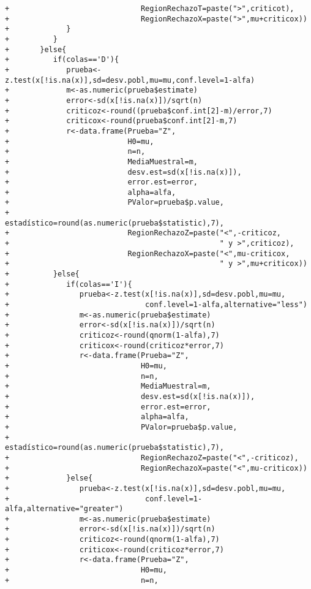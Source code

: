 \begin{solucion}
\begin{verbatim}
+                              RegionRechazoT=paste(">",criticot),
+                              RegionRechazoX=paste(">",mu+criticox))
+             }
+          }
+       }else{
+          if(colas=='D'){
+             prueba<-z.test(x[!is.na(x)],sd=desv.pobl,mu=mu,conf.level=1-alfa)
+             m<-as.numeric(prueba$estimate)
+             error<-sd(x[!is.na(x)])/sqrt(n)
+             criticoz<-round((prueba$conf.int[2]-m)/error,7)
+             criticox<-round(prueba$conf.int[2]-m,7)
+             r<-data.frame(Prueba="Z",
+                           H0=mu,
+                           n=n,
+                           MediaMuestral=m,
+                           desv.est=sd(x[!is.na(x)]),
+                           error.est=error,
+                           alpha=alfa,
+                           PValor=prueba$p.value,
+                           estadístico=round(as.numeric(prueba$statistic),7),
+                           RegionRechazoZ=paste("<",-criticoz,
+                                                " y >",criticoz),
+                           RegionRechazoX=paste("<",mu-criticox,
+                                                " y >",mu+criticox))
+          }else{
+             if(colas=='I'){
+                prueba<-z.test(x[!is.na(x)],sd=desv.pobl,mu=mu,
+                               conf.level=1-alfa,alternative="less")
+                m<-as.numeric(prueba$estimate)
+                error<-sd(x[!is.na(x)])/sqrt(n)
+                criticoz<-round(qnorm(1-alfa),7)
+                criticox<-round(criticoz*error,7)
+                r<-data.frame(Prueba="Z",
+                              H0=mu,
+                              n=n,
+                              MediaMuestral=m,
+                              desv.est=sd(x[!is.na(x)]),
+                              error.est=error,
+                              alpha=alfa,
+                              PValor=prueba$p.value,
+                              estadístico=round(as.numeric(prueba$statistic),7),
+                              RegionRechazoZ=paste("<",-criticoz),
+                              RegionRechazoX=paste("<",mu-criticox))
+             }else{
+                prueba<-z.test(x[!is.na(x)],sd=desv.pobl,mu=mu,
+                               conf.level=1-alfa,alternative="greater")
+                m<-as.numeric(prueba$estimate)
+                error<-sd(x[!is.na(x)])/sqrt(n)
+                criticoz<-round(qnorm(1-alfa),7)
+                criticox<-round(criticoz*error,7)
+                r<-data.frame(Prueba="Z",
+                              H0=mu,
+                              n=n,

\end{verbatim}
\end{solucion}
